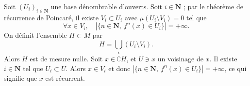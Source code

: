 \documentclass[a4paper,12pt,openany]{article}
\theoremstyle{plain}
\theoremstyle{definition}
\newcommand{\N}{\mathbf{N}}
\begin{document}
\vspace{0.6cm}

 \vspace{1.5mm} 

\noindent Soit $(U_i)_{i \in \N}$ une base d\'enombrable d'ouverts.  
\noindent Soit $i \in \N$ ; par le th\'eor\`eme de r\'ecurrence de Poincar\'e, il existe $V_i \subset U_i$ avec $\mu(U_i \setminus V_i) = 0$  tel que
$$
\forall x \in V_i, \quad \left|\{n \in \N,~ f^n(x) \in U_i\}\right| = +\infty.
$$ 
\noindent On d\'efinit l'ensemble $H \subset M$ par
$$
H = \bigcup_i (U_i \setminus V_i).
$$
Alors $H$ est de mesure nulle.
\noindent Soit $x \in \complement H$, et $U \ni x$ un voisinage de $x$.  Il existe $i \in \N$ tel que $U_i \subset U$.  Alors $x \in V_i$ et donc $\left|\{n \in \N,~f^n(x) \in U_i\}\right| = +\infty$, ce qui signifie que $x$ est r\'ecurrent.
\vspace{0.6cm}

 \vspace{1.5mm} 
\end{document}
